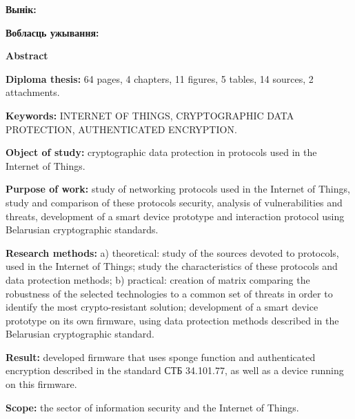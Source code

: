 \textbf{Вынік:} 

\textbf{Вобласць ужывання:} 


\newpage
\begin{center}{\bf \Large Abstract}\end{center}

\textbf{Diploma thesis:} 64 pages, 4 chapters, 11 figures, 5 tables, 14 sources, 2 attachments.

\textbf{Keywords:} INTERNET OF THINGS, CRYPTOGRAPHIC DATA \newline PROTECTION, 
AUTHENTICATED ENCRYPTION.

\textbf{Object of study:} cryptographic data protection in protocols used in the Internet of Things.

\textbf{Purpose of work:} study of networking protocols used in the Internet of Things, study and 
comparison of these protocols security, analysis of vulnerabilities and threats, development 
of a smart device prototype and interaction protocol using Belarusian cryptographic standards.

\textbf{Research methods:} a) theoretical: study of the sources devoted to protocols, used in the 
Internet of Things; study the characteristics of these protocols and data protection methods; 
b) practical: creation of matrix comparing the robustness of the selected technologies to a common 
set of threats in order to identify the most crypto-resistant solution; development 
of a smart device prototype on its own firmware, using data protection methods described in the Belarusian 
cryptographic standard.

\textbf{Result:} developed firmware that uses sponge function and authenticated encryption described 
in the standard СТБ 34.101.77, as well as a device running on this firmware.

\textbf{Scope:} the sector of information security and the Internet of Things.
